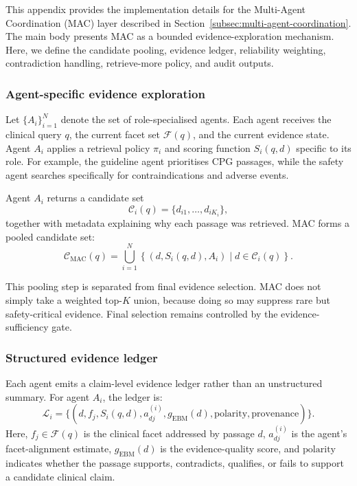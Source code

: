 \documentclass[conference]{IEEEtran}
\begin{document}
This appendix provides the implementation details for the Multi-Agent Coordination (MAC) layer described in Section~\ref{subsec:multi-agent-coordination}. The main body presents MAC as a bounded evidence-exploration mechanism. Here, we define the candidate pooling, evidence ledger, reliability weighting, contradiction handling, retrieve-more policy, and audit outputs.

\subsubsection*{Agent-specific evidence exploration}

Let $\{A_i\}_{i=1}^{N}$ denote the set of role-specialised agents. Each agent receives the clinical query $q$, the current facet set $\mathcal{F}(q)$, and the current evidence state. Agent $A_i$ applies a retrieval policy $\pi_i$ and scoring function $S_i(q,d)$ specific to its role. For example, the guideline agent prioritises CPG passages, while the safety agent searches specifically for contraindications and adverse events.

Agent $A_i$ returns a candidate set
\[
\mathcal{C}_i(q)=\{d_{i1},\ldots,d_{iK_i}\},
\]
together with metadata explaining why each passage was retrieved. MAC forms a pooled candidate set:
\begin{equation}
\label{eq:mac-pool}
\mathcal{C}_{\mathrm{MAC}}(q)
=
\bigcup_{i=1}^{N}
\left\{
(d,S_i(q,d),A_i)
\mid
d\in\mathcal{C}_i(q)
\right\}.
\end{equation}

This pooling step is separated from final evidence selection. MAC does not simply take a weighted top-$K$ union, because doing so may suppress rare but safety-critical evidence. Final selection remains controlled by the evidence-sufficiency gate.

\subsubsection*{Structured evidence ledger}

Each agent emits a claim-level evidence ledger rather than an unstructured summary. For agent $A_i$, the ledger is:
\[
\mathcal{L}_i
=
\{
(d,f_j,S_i(q,d),a^{(i)}_{dj},g_{\mathrm{EBM}}(d),
\mathrm{polarity},\mathrm{provenance})
\}.
\]
Here, $f_j\in\mathcal{F}(q)$ is the clinical facet addressed by passage $d$, $a^{(i)}_{dj}$ is the agent's facet-alignment estimate, $g_{\mathrm{EBM}}(d)$ is the evidence-quality score, and $\mathrm{polarity}$ indicates whether the passage supports, contradicts, qualifies, or fails to support a candidate clinical claim.
\end{document}
